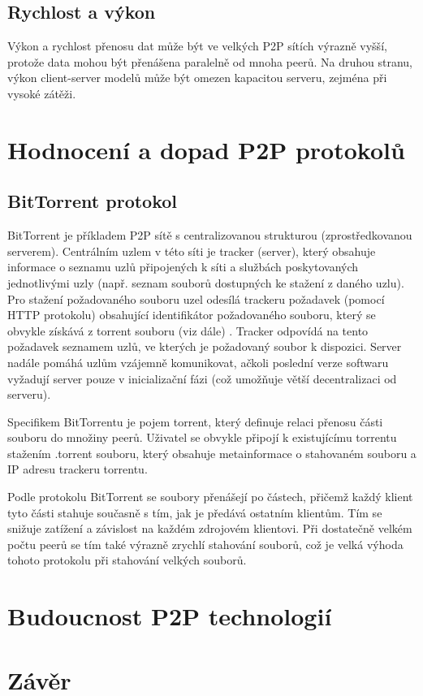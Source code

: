 \documentclass[10pt,twoside,czech,a4paper]{article}
\begin{document}
\subsection{Rychlost a výkon}

Výkon a rychlost přenosu dat může být ve velkých P2P sítích výrazně vyšší, protože data mohou být přenášena paralelně od mnoha peerů.
Na druhou stranu, výkon client-server modelů může být omezen kapacitou serveru, zejména při vysoké zátěži.


\section{Hodnocení a dopad P2P protokolů}

\subsection{BitTorrent protokol}

BitTorrent je příkladem P2P sítě s centralizovanou strukturou (zprostředkovanou serverem).
Centrálním uzlem v této síti je tracker (server), který obsahuje informace o seznamu uzlů připojených k síti a službách poskytovaných jednotlivými uzly (např. seznam souborů dostupných ke stažení z daného uzlu).
Pro stažení požadovaného souboru uzel odesílá trackeru požadavek (pomocí HTTP protokolu) obsahující identifikátor požadovaného souboru, který se obvykle získává z torrent souboru (viz dále) \cite{Chokkalingam2004}.
Tracker odpovídá na tento požadavek seznamem uzlů, ve kterých je požadovaný soubor k dispozici\cite{Radchenko2012}.
Server nadále pomáhá uzlům vzájemně komunikovat, ačkoli poslední verze softwaru vyžadují server pouze v inicializační fázi (což umožňuje větší decentralizaci od serveru)\cite{Lande2008}.

Specifikem BitTorrentu je pojem torrent, který definuje relaci přenosu části souboru do množiny peerů.
Uživatel se obvykle připojí k existujícímu torrentu stažením .torrent souboru, který obsahuje metainformace o stahovaném souboru a IP adresu trackeru torrentu\cite{Legout2005, Chokkalingam2004}.

Podle protokolu BitTorrent se soubory přenášejí po částech, přičemž každý klient tyto části stahuje současně s tím, jak je předává ostatním klientům.
Tím se snižuje zatížení a závislost na každém zdrojovém klientovi\cite{Lande2008}.
Při dostatečně velkém počtu peerů se tím také výrazně zrychlí stahování souborů, což je velká výhoda tohoto protokolu při stahování velkých souborů\cite{Barakat2004}.


\section{Budoucnost P2P technologií}


\section{Závěr}




\end{document}

